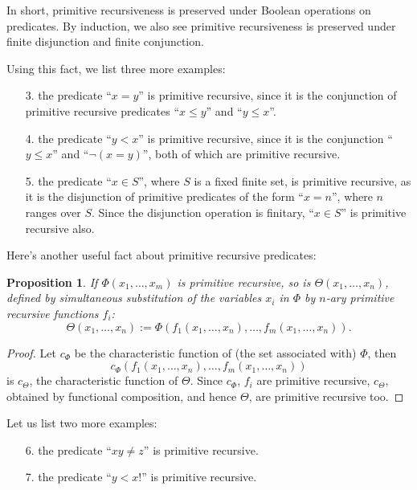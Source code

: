\documentclass[12pt]{article}
\newtheorem{prop}{Proposition}
\begin{document}
In short, primitive recursiveness is preserved under Boolean operations on predicates.  By induction, we also see primitive recursiveness is preserved under finite disjunction and finite conjunction.

Using this fact, we list three more examples: 
\begin{enumerate}
\item[3.] the predicate ``$x=y$'' is primitive recursive, since it is the conjunction of primitive recursive predicates ``$x\le y$'' and ``$y \le x$''.
\item[4.] the predicate ``$y<x$'' is primitive recursive, since it is the conjunction ``$y\le x$'' and ``$\neg (x=y)$'', both of which are primitive recursive.
\item[5.] the predicate ``$x \in S$'', where $S$ is a fixed finite set, is primitive recursive, as it is the disjunction of primitive predicates of the form ``$x=n$'', where $n$ ranges over $S$.  Since the disjunction operation is finitary, ``$x\in S$'' is primitive recursive also.
\end{enumerate}

Here's another useful fact about primitive recursive predicates:
\begin{prop}  If $\Phi(x_1,\ldots,x_m)$ is primitive recursive, so is $\Theta(x_1,\ldots,x_n)$, defined by simultaneous substitution of the variables $x_i$ in $\Phi$ by $n$-ary primitive recursive functions $f_i$: 
$$\Theta(x_1,\ldots,x_n):= \Phi(f_1(x_1,\ldots,x_n),\ldots, f_m(x_1,\ldots,x_n)).$$
\end{prop}
\begin{proof}
Let $c_{\Phi}$ be the characteristic function of (the set associated with) $\Phi$, then $$c_{\Phi}(f_1(x_1,\ldots,x_n),\ldots, f_m(x_1,\ldots,x_n))$$ is $c_{\Theta}$, the characteristic function of $\Theta$.  Since $c_{\Phi}$, $f_i$ are primitive recursive, $c_{\Theta}$, obtained by functional composition, and hence $\Theta$, are primitive recursive too.
\end{proof}

Let us list two more examples:
\begin{enumerate}
\item[6.] the predicate ``$xy\ne z$'' is primitive recursive.
\item[7.] the predicate ``$y< x!$'' is primitive recursive.
\end{enumerate}
\end{document}
